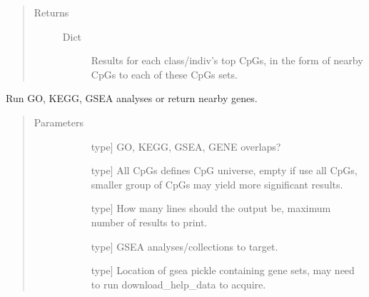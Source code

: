 \documentclass[letterpaper,10pt,english]{sphinxmanual}
\begin{document}
\begin{fulllineitems}
\begin{fulllineitems}
\begin{quote}
\begin{description}
\begin{description}
\end{description}

\item[{Returns}] \leavevmode\begin{description}
\item[{Dict}] \leavevmode
Results for each class/indiv’s top CpGs, in the form of nearby CpGs to each of these CpGs sets.

\end{description}

\end{description}\end{quote}

\end{fulllineitems}


\begin{fulllineitems}
\label{\detokenize{index:methylnet.interpretation_classes.BioInterpreter.gometh}}
Run GO, KEGG, GSEA analyses or return nearby genes.
\begin{quote}\begin{description}
\item[{Parameters}] \leavevmode\begin{description}
\item[{}] \leavevmode{[}type{]}
GO, KEGG, GSEA, GENE overlaps?

\item[{}] \leavevmode{[}type{]}
All CpGs defines CpG universe, empty if use all CpGs, smaller group of CpGs may yield more significant results.

\item[{}] \leavevmode{[}type{]}
How many lines should the output be, maximum number of results to print.

\item[{}] \leavevmode{[}type{]}
GSEA analyses/collections to target.

\item[{}] \leavevmode{[}type{]}
Location of gsea pickle containing gene sets, may need to run download\_help\_data to acquire.


\end{description}
\end{description}
\end{quote}
\end{fulllineitems}
\end{fulllineitems}
\end{document}
